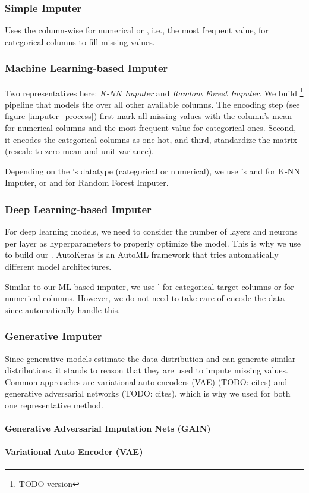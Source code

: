 \subsubsection{Simple Imputer}
%
Uses the column-wise  for numerical or , i.e., the most frequent value,  for categorical columns to fill missing values.


\subsubsection{Machine Learning-based Imputer}
%
Two representatives here: \emph{K-NN Imputer} and \emph{Random Forest Imputer}. We build \footnote{TODO version} pipeline that models the  over all other available columns. The encoding step (see figure \ref{imputer_process}) first mark all missing values with the column's mean for numerical columns and the most frequent value for categorical ones. Second, it encodes the categorical columns as one-hot, and third, standardize  the matrix (rescale to zero mean and unit variance).

Depending on the 's datatype (categorical or numerical), we use 's  and  for K-NN Imputer, or  and  for Random Forest Imputer.


\subsubsection{Deep Learning-based Imputer}
%
For deep learning models, we need to consider the number of layers and neurons per layer as hyperparameters to properly optimize the model. This is why we use \cite{AutoKeras} to build our . AutoKeras is an AutoML framework that tries automatically different model architectures.

Similar to our ML-based imputer, we use '  for categorical target columns or  for numerical columns. However, we do not need to take care of encode the data since  automatically handle this.


\subsubsection{Generative Imputer}
%
Since generative models estimate the data distribution and can generate similar distributions\cite{Generativ_survey}, it stands to reason that they are used to impute missing values. Common approaches are variational auto encoders (VAE) (TODO: cites) and generative adversarial networks (TODO: cites), which is why we used for both one representative method.

\paragraph{Generative Adversarial Imputation Nets (GAIN)}
%



\paragraph{Variational Auto Encoder (VAE)}
%
